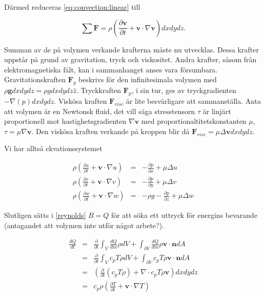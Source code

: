 Därmed reduceras \eqref{eq:convection:linear} till

\begin{equation}
\label{eq:convection:linearfinal}
\sum \mathbf{F} = \rho \left( \frac{\partial \mathbf{v}}{\partial t} + \mathbf{v}\cdot \nabla\mathbf{v} \right)dxdydz.
\end{equation}

Summan av de på volymen verkande krafterna måste nu utvecklas. Dessa krafter uppstår på grund av gravitation, tryck och viskositet. Andra krafter, såsom från elektromagnetiska fält, kan i sammanhanget anses vara försumbara. Gravitationskraften $\mathbf{F}_g$ beskrivs för den infinitesimala volymen med $\rho \mathbf{g} dxdydz = \rho g dxdydz \hat{z}$. Tryckkraften $\mathbf{F}_p$, i sin tur, ges av tryckgradienten $-\nabla \left( p \right) dxdydz$. Viskösa kraften $\mathbf{F}_{visc}$ är lite besvärligare att sammanställa. Anta att volymen är en Newtonsk fluid, det vill säga stresstensorn $\tau$ är linjärt proportionell mot hastighetsgradienten $\nabla\mathbf{v}$ med proportionaltitetskonstanten $\mu$, $\tau = \mu \nabla \mathbf{v}$. Den viskösa kraften verkande på kroppen blir då $\mathbf{F}_{visc} = \mu\Delta\mathbf{v}dxdydz$.


Vi har alltså ekvationssystemet

\begin{eqnarray}
\label{eq:convection:momentum}
\rho\left(\frac{\partial u}{\partial t} + \mathbf{v}\cdot \nabla u\right) & = & -\frac{\partial p}{\partial x} + \mu\Delta u \nonumber\\
\rho\left(\frac{\partial v}{\partial t} + \mathbf{v}\cdot \nabla v\right) & = & -\frac{\partial p}{\partial y} + \mu\Delta v\\
\rho\left(\frac{\partial w}{\partial t} + \mathbf{v}\cdot \nabla w\right) & = & -\rho g -\frac{\partial p}{\partial z} + \mu\Delta w\nonumber
\end{eqnarray}


Slutligen sätts i \ref{reynolds} $B=Q$ för att söka ett uttryck för energins bevarande (antagandet att volymen inte utför något arbete?).

\begin{eqnarray}
\label{reynoldsenergyone}
\frac{dQ}{dt} & = & \frac{\partial}{\partial t} \int_V \frac{dQ}{dm}\rho dV + \int_{\partial V}\frac{dQ}{dm}\rho \mathbf{v} \cdot \mathbf{n} dA \nonumber\\
& = & \frac{\partial}{\partial t} \int_V c_p T \rho dV + \int_{\partial V} c_p T \rho \mathbf{v} \cdot \mathbf{n} dA \nonumber\\
& = & \left(\frac{\partial}{\partial t} \left( c_p T \rho \right) + \nabla\cdot c_p T \rho \mathbf{v}\right) dxdydz \nonumber\\
& = & c_p \rho \left( \frac{\partial T}{\partial t} + \mathbf{v}\cdot \nabla T\right)
\end{eqnarray}

